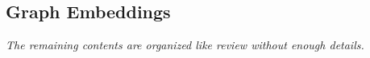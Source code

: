 

\subsection{Graph Embeddings}




\begin{center}
    \textit{
    The remaining contents are organized like review without enough details.
    }
\end{center}








